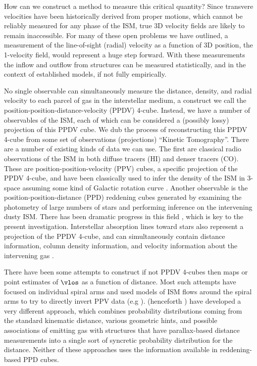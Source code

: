 How can we construct a method to measure this critical quantity? Since transvere velocities have been historically derived from proper motions, which cannot be reliably measured for any phase of the ISM, true 3D velocity fields are likely to remain inaccessible. 
For many of these open problems we have outlined, a measurement of the line-of-sight (radial) velocity as a function of 3D position, the 1-velocity field, would represent a huge step forward. With these measurements the inflow and outflow from structures can be measured statistically, and in the context of established models, if not fully empirically. 

No single observable can simultaneously measure the distance, density, and radial velocity to each parcel of gas in the interstellar medium, a construct we call the position-position-distance-velocity (PPDV) 4-cube. Instead, we have a number of observables of the ISM, each of which can be considered a (possibly lossy) projection of this PPDV cube. We dub the process of reconstructing this PPDV 4-cube from some set of observations (projections) ``Kinetic Tomography''. There are a number of existing kinds of data we can use. The first are classical radio observations of the ISM in both diffuse tracers (HI) and denser tracers (CO). These are position-position-velocity (PPV) cubes, a specific projection of the PPDV 4-cube, and have been classically used to infer the density of the ISM in 3-space assuming some kind of Galactic rotation curve \citep[e.g.][]{Levine_2006}. Another observable is the position-position-distance (PPD) reddening cubes generated by examining the photometry of large numbers of stars and performing inference on the intervening dusty ISM. There has been dramatic progress in this field \cite{Marshall_2006,Lallement_2014,Green_2015}, which is key to the present investigation. Interstellar absorption lines toward stars also represent a projection of the PPDV 4-cube, and can simultaneously contain distance information, column density information, and velocity information about the intervening gas \cite{Welsh10,Zasowski_2014,2015MmSAI..86..521Z}.

There have been some attempts to construct if not PPDV 4-cubes then maps or point estimates of $\vlos$ as a function of distance. 
Most such attempts have focused on individual spiral arms and used models of ISM flows around the spiral arms to try to directly invert PPV data (e.g  \citealt{1972A&A....16..118S,Foster_2006}).
\citet{Reid_2016} (henceforth \Reid{}) have developed a very different approach, which combines probability distributions coming from the standard kinematic distance, various geometric hints, and possible associations of emitting gas with structures that have parallax-based distance measurements into a single sort of syncretic probability distribution for the distance. 
Neither of these approaches uses the information available in reddening-based PPD cubes. 

